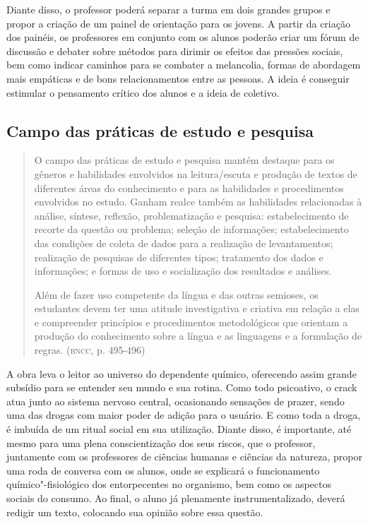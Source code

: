\documentclass[11pt]{extarticle}
\begin{document}
Diante disso, o professor poderá separar a turma em dois grandes grupos
e propor a criação de um painel de orientação para os jovens. A partir
da criação dos painéis, os professores em conjunto com os alunos poderão
criar um fórum de discussão e debater sobre métodos para dirimir os
efeitos das pressões sociais, bem como indicar caminhos para se combater
a melancolia, formas de abordagem mais empáticas e de bons
relacionamentos entre as pessoas. A ideia é conseguir estimular o
pensamento crítico dos alunos e a ideia de coletivo.

\subsection{Campo das práticas de estudo e pesquisa}

\begin{quote}
O campo das práticas de estudo e pesquisa mantém destaque para os
gêneros e habilidades envolvidos na leitura/escuta e produção de textos
de diferentes áreas do conhecimento e para as habilidades e
procedimentos envolvidos no estudo. Ganham realce também as habilidades
relacionadas à análise, síntese, reflexão, problematização e pesquisa:
estabelecimento de recorte da questão ou problema; seleção de
informações; estabelecimento das condições de coleta de dados para a
realização de levantamentos; realização de pesquisas de diferentes
tipos; tratamento dos dados e informações; e formas de uso e
socialização dos resultados e análises.

Além de fazer uso competente da língua e das outras semioses, os
estudantes devem ter uma atitude investigativa e criativa em relação a
elas e compreender princípios e procedimentos metodológicos que orientam
a produção do conhecimento sobre a língua e as linguagens e a formulação
de regras. (\textsc{bncc}, p. 495-496)
\end{quote}

A obra leva o leitor ao universo do dependente químico, oferecendo
assim grande subsídio para se entender seu mundo e sua rotina. Como
todo psicoativo, o crack atua junto ao sistema nervoso central,
ocasionando sensações de prazer, sendo uma das drogas com maior poder
de adição para o usuário. E como toda a droga, é imbuída de um ritual
social em sua utilização. Diante disso, é importante, até mesmo para
uma plena conscientização dos seus riscos, que o professor, juntamente
com os professores de ciências humanas e ciências da natureza, propor
uma roda de conversa com os alunos, onde se explicará o funcionamento
químico"-fisiológico dos entorpecentes no organismo, bem como os
aspectos sociais do consumo. Ao final, o aluno já plenamente
instrumentalizado, deverá redigir um texto, colocando sua opinião
sobre essa questão.
\end{document}
